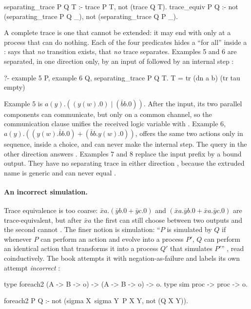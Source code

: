 {{\begin{lprolog}
separating_trace P Q T :- trace P T,
                          not (trace Q T).
trace_equiv P Q :- not (separating_trace P Q _),
                   not (separating_trace Q P _).
\end{lprolog}
\noindent A complete trace is one that cannot be extended: it may end with  only at a process
that can do nothing. Each of the four predicates hides a ``for all'' inside a : 
says that \emph{no} transition exists,  that \emph{no} trace separates. Examples 5 and 6
are separated, in one direction only, by an input of  followed by an internal step
:
\begin{lprolog}
?- example 5 P, example 6 Q, separating_trace P Q T.
T = tr (dn a b) (tr tau empty)
\end{lprolog}
\noindent Example 5 is $a(y).((y(w).0)\mid(\bar b b.0))$. After the input, its two parallel components
can communicate, but only on a common channel, so the communication clause unifies the received logic
variable with . Example 6, $a(y).((y(w).\bar b b.0)+(\bar b b.y(w).0))$, offers the same two
actions only in sequence, inside a choice, and can never make the internal step. The query in the other
direction answers . Examples 7 and 8 replace the input prefix by a bound output. They have no
separating trace in either direction , because the extruded name is generic and can never equal
.

\paragraph{An incorrect simulation.} Trace equivalence is too coarse: $\bar x a.(\bar y b.0+\bar y c.0)$
and $(\bar x a.\bar y b.0+\bar x a.\bar y c.0)$ are trace-equivalent, but after $\bar x a$ the first can
still choose between two outputs and the second cannot . The finer notion is simulation: ``$P$
is simulated by $Q$ if whenever $P$ can perform an action and evolve into a process $P'$, $Q$ can perform
an identical action that transforms it into a process $Q'$ that simulates $P'$'' , read
coinductively. The book attempts it with negation-as-failure and labels its own attempt
\emph{incorrect} :
\begin{lprolog}
type foreach2  (A -> B -> o) -> (A -> B -> o) -> o.
type sim       proc -> proc -> o.

foreach2 P Q :- not (sigma X\ sigma Y\ P X Y, not (Q X Y)).


\end{lprolog}}}
